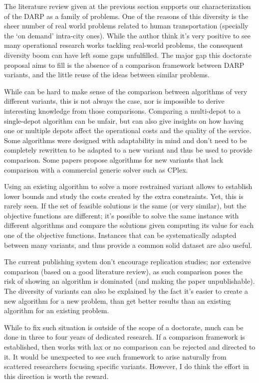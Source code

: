\documentclass[english,plano-doutorado,twoside]{iiufrgs}
\begin{document}
The literature review given at the previous section supports our characterization of the DARP as a family of problems. One of the reasons of this diversity is the sheer number of real world problems related to human transportation (specially the `on demand' intra-city ones). While the author think it's very positive to see many operational research works tackling real-world problems, the consequent diversity boom can have left some gaps unfulfilled. The major gap this doctorate proposal aims to fill is the absence of a comparison framework between DARP variants, and the little reuse of the ideas between similar problems.

While can be hard to make sense of the comparison between algorithms of very different variants, this is not always the case, nor is impossible to derive interesting knowledge from those comparisons. Comparing a multi-depot to a single-depot algorithm can be unfair, but can also give insights on how having one or multiple depots affect the operational costs and the quality of the service. Some algorithms were designed with adaptability in mind and don't need to be completely rewritten to be adapted to a new variant and thus be used to provide comparison. Some papers propose algorithms for new variants that lack comparison with a commercial generic solver such as CPlex.

Using an existing algorithm to solve a more restrained variant allows to establish lower bounds and study the costs created by the extra constraints. Yet, this is rarely seen. If the set of feasible solutions is the same (or very similar), but the objective functions are different; it's possible to solve the same instance with different algorithms and compare the solutions given computing its value for each one of the objective functions. Instances that can be systematically adapted between many variants, and thus provide a common solid dataset are also useful.

The current publishing system don't encourage replication studies; nor extensive comparison (based on a good literature review), as such comparison poses the risk of showing an algorithm is dominated (and making the paper unpublishable). The diversity of variants can also be explained by the fact it's easier to create a new algorithm for a new problem, than get better results than an existing algorithm for an existing problem. 

While to fix such situation is outside of the scope of a doctorate, much can be done in three to four years of dedicated research. If a comparison framework is established, then works with lax or no comparison can be rejected and directed to it. It would be unexpected to see such framework to arise naturally from scattered researchers focusing specific variants. However, I do think the effort in this direction is worth the reward.
\end{document}

